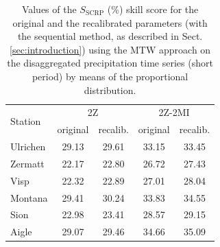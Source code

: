 \documentclass[hess, manuscript]{copernicus}
\begin{document}
\begin{table}[htb]
	\caption{Values of the $S_{\text{SCRP}}$ (\%) skill score for the original and the recalibrated parameters (with the sequential method, as described in Sect. \ref{sec:introduction}) using the MTW approach on the disaggregated precipitation time series (short period) by means of the proportional distribution.}
	\begin{center}
		\begin{tabular}{l c c c c}
			\hline
			\multirow{2}{*}{Station} & \multicolumn{2}{c}{2Z} & \multicolumn{ 2}{c}{2Z-2MI} \\
			& original & recalib. & original & recalib. \\
			\hline
			Ulrichen & 29.13 & 29.61 & 33.15 & 33.45 \\
			Zermatt & 22.17 & 22.80 & 26.72 & 27.43 \\
			Visp & 22.32 & 22.89 & 27.01 & 28.04 \\
			Montana & 29.41 & 30.24 & 33.83 & 34.55 \\
			Sion & 22.98 & 23.41 & 28.57 & 29.15 \\
			Aigle & 29.07 & 29.46 & 34.66 & 35.09 \\
			\hline
		\end{tabular}
	\end{center}
	\label{table:disaggregation_proportional}
\end{table}
\end{document}
